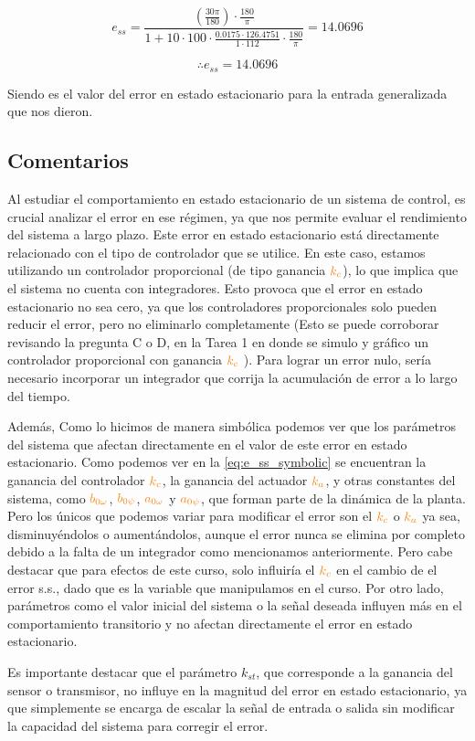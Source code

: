 \begin{equation}
  e_{ss} = \frac{\left(\frac{30 \pi}{180}\right) \cdot \frac{180}{\pi}}{1 + 10 \cdot 100 \cdot \frac{0.0175 \cdot 126.4751}{1 \cdot 112} \cdot \frac{180}{\pi}} = 14.0696
\end{equation}

\[
\boxed{\therefore e_{ss} = 14.0696}
\]

Siendo es el valor del error en estado estacionario para la entrada generalizada que nos dieron.


\FloatBarrier
\subsection{Comentarios}

Al estudiar el comportamiento en estado estacionario de un sistema de control, es crucial analizar el error en ese régimen, ya que nos permite evaluar el rendimiento del sistema a largo plazo. Este error en estado estacionario está directamente relacionado con el tipo de controlador que se utilice. En este caso, estamos utilizando un controlador proporcional (de tipo ganancia \(\nara{k_c}\)), lo que implica que el sistema no cuenta con integradores. Esto provoca que el error en estado estacionario no sea cero, ya que los controladores proporcionales solo pueden reducir el error, pero no eliminarlo completamente (Esto se puede corroborar revisando la pregunta C o D, en la Tarea 1 en donde se simulo y gráfico un controlador proporcional con ganancia \(\nara{k_c} \) ). Para lograr un error nulo, sería necesario incorporar un integrador que corrija la acumulación de error a lo largo del tiempo.

Además, Como lo hicimos de manera simbólica podemos ver que los parámetros del sistema que afectan directamente en el valor de este error en estado estacionario. Como podemos ver en la \eqref{eq:e_ss_symbolic} se encuentran la ganancia del controlador \(\nara{k_c}\), la ganancia del actuador \(\nara{k_a}\), y otras constantes del sistema, como \(\nara{b_{0\omega}}\), \(\nara{b_{0\psi}}\), \(\nara{a_{0\omega}}\) y \(\nara{a_{0\psi}}\), que forman parte de la dinámica de la planta. Pero los únicos que podemos variar para modificar el error son el \(\nara{k_c}\) o \(\nara{k_a}\) ya sea, disminuyéndolos o aumentándolos, aunque el error nunca se elimina por completo debido a la falta de un integrador como mencionamos anteriormente. Pero cabe destacar que para efectos de este curso, solo influiría el \(\nara{k_c}\) en el cambio de el error s.s., dado que es la variable que manipulamos en el curso. Por otro lado, parámetros como el valor inicial del sistema o la señal deseada influyen más en el comportamiento transitorio y no afectan directamente el error en estado estacionario.

Es importante destacar que el parámetro \(k_{st}\), que corresponde a la ganancia del sensor o transmisor, no influye en la magnitud del error en estado estacionario, ya que simplemente se encarga de escalar la señal de entrada o salida sin modificar la capacidad del sistema para corregir el error.

